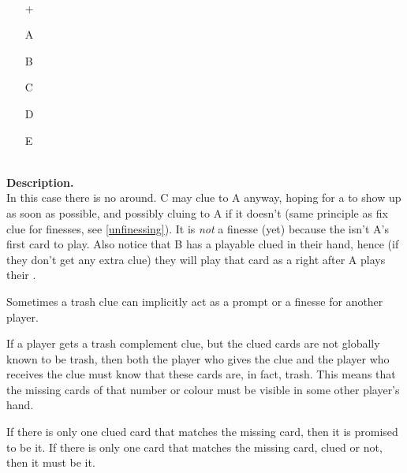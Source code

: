 \begin{example}	\hfill \\
	\begin{minipage}{0.45\textwidth}
		\begin{itemize}
			\item[\Large +]      
			\item[\Large A]    
			\item[\Large B]    
			\item[\Large C]    
			\item[\Large D]    
			\item[\Large E]    
		\end{itemize}
	\end{minipage}%
	\begin{minipage}{0.55\textwidth}
		\hfill \\
		
		\textbf{Description.} \\
		
		In this case there is no  around. C may clue  to A anyway, hoping for a  to show up as soon as possible, and possibly cluing  to A if it doesn't (same principle as fix clue for finesses, see \ref{unfinessing}). It is \emph{not} a finesse (yet) because the  isn't A's first card to play. Also notice that B has a playable clued  in their hand, hence (if they don't get any extra clue) they will play that card as a  right after A plays their .
	\end{minipage}
\end{example} \vspace{0.15 cm}

Sometimes a trash clue can implicitly act as a prompt or a finesse for another player.

\begin{convention}
	If a player gets a trash complement clue, but the clued cards are not globally known to be trash, then both the player who gives the clue and the player who receives the clue must know that these cards are, in fact, trash. This means that the missing cards of that number or colour must be visible in some other player's hand.
	
	If there is only one clued card that matches the missing card, then it is promised to be it. If there is only one card that matches the missing card, clued or not, then it must be it.
\end{convention}


